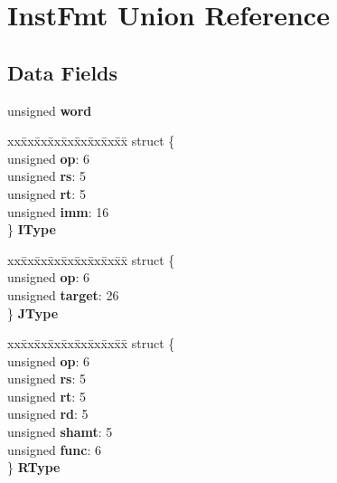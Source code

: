 \hypertarget{unionInstFmt}{}\section{Inst\+Fmt Union Reference}
\label{unionInstFmt}
\subsection*{Data Fields}
\begin{DoxyCompactItemize}
\item 
\mbox{\label{unionInstFmt_a8827e77f6fc28d62ff4ec745756d453b}} 
unsigned {\bfseries word}
\item 
\mbox{\label{unionInstFmt_ad37da99cdaf494052dd7697e049d6477}} 
\begin{tabbing}
xx\=xx\=xx\=xx\=xx\=xx\=xx\=xx\=xx\=\kill
struct \{\\
\>unsigned {\bfseries op}: 6\\
\>unsigned {\bfseries rs}: 5\\
\>unsigned {\bfseries rt}: 5\\
\>unsigned {\bfseries imm}: 16\\
\} {\bfseries IType}\\

\end{tabbing}\item 
\mbox{\label{unionInstFmt_a8650ff6c201bdd3cecde193fb9b3cfbc}} 
\begin{tabbing}
xx\=xx\=xx\=xx\=xx\=xx\=xx\=xx\=xx\=\kill
struct \{\\
\>unsigned {\bfseries op}: 6\\
\>unsigned {\bfseries target}: 26\\
\} {\bfseries JType}\\

\end{tabbing}\item 
\mbox{\label{unionInstFmt_a4e945ba4ea4799e72b48ae47e34890bf}} 
\begin{tabbing}
xx\=xx\=xx\=xx\=xx\=xx\=xx\=xx\=xx\=\kill
struct \{\\
\>unsigned {\bfseries op}: 6\\
\>unsigned {\bfseries rs}: 5\\
\>unsigned {\bfseries rt}: 5\\
\>unsigned {\bfseries rd}: 5\\
\>unsigned {\bfseries shamt}: 5\\
\>unsigned {\bfseries func}: 6\\
\} {\bfseries RType}\\


\end{tabbing}
\end{DoxyCompactItemize}
